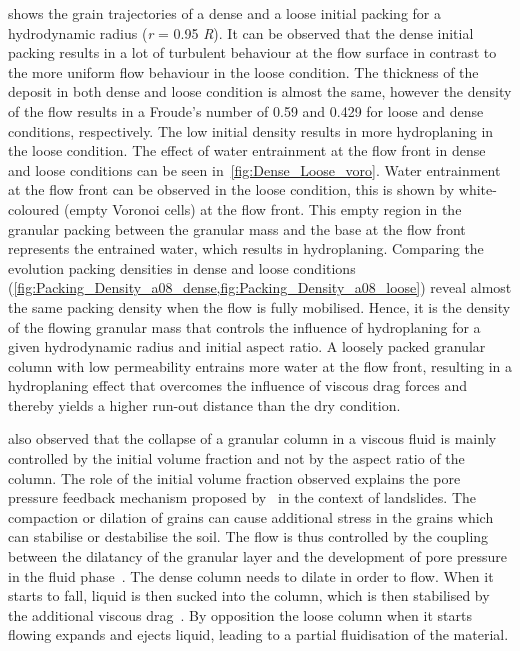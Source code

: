  shows the grain trajectories of a dense and a loose 
initial packing for a hydrodynamic radius (\textit{r} = 0.95 \textit{R}). It 
can be observed that 
the dense initial packing results in a lot of turbulent behaviour at the flow 
surface in contrast to the more uniform flow behaviour in the loose condition. 
The thickness of the deposit in both dense and loose condition is almost the 
same, however the density of the flow results in a Froude's number of 0.59 and
0.429 for loose and dense conditions, respectively. The low initial density 
results in more hydroplaning in the loose condition. The effect of water 
entrainment at the flow front in dense and loose conditions can be seen 
in~\cref{fig:Dense_Loose_voro}. Water entrainment at the flow front can be 
observed in the loose condition, this is shown by white-coloured (empty Voronoi 
cells) at the flow front. This empty region in the granular packing between the 
granular mass and the base at the flow front represents the entrained water, 
which results in hydroplaning. Comparing the evolution packing densities in 
dense and loose conditions
(\cref{fig:Packing_Density_a08_dense,fig:Packing_Density_a08_loose}) 
reveal almost the same packing density when the flow is fully mobilised. Hence, 
it is the density of the flowing granular mass that controls the influence of 
hydroplaning for a given hydrodynamic radius and initial aspect ratio. A 
loosely packed granular column with low permeability entrains 
more water at the flow front, resulting in a hydroplaning effect that overcomes 
the influence of viscous drag forces and thereby yields a higher run-out 
distance than the dry condition.

\citet{Rondon2011} also observed that the collapse of a granular column in a 
viscous fluid is mainly controlled by the initial volume fraction and not by 
the aspect ratio of the column. The role of the initial volume fraction 
observed explains the pore pressure feedback mechanism proposed 
by~\citep{Schaeffer2008,Iverson2000} in the context of landslides. The 
compaction or dilation of grains can cause additional stress in the grains 
which can stabilise or destabilise the soil. The flow is thus controlled by the 
coupling between the dilatancy of the granular layer and the development of 
pore pressure in the fluid phase~\citep{Pailha2008}. The dense column needs to 
dilate in order to flow. When it starts to fall, liquid is then sucked into the 
column, which is then stabilised by the additional viscous 
drag~\citep{Rondon2011,Topin2012}. By opposition the loose column when 
it starts flowing expands and ejects liquid, leading to a partial fluidisation 
of the material.


